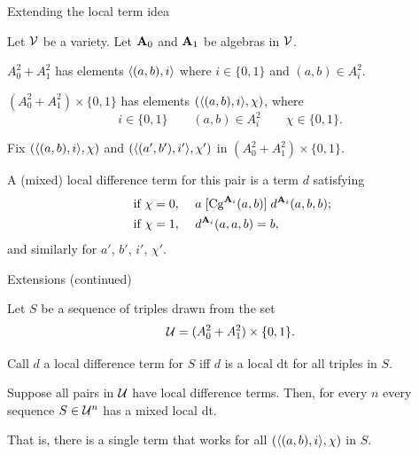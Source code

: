 \documentclass[notes=hide,12pt,xcolor=dvipsnames%
   ]{beamer}
\renewcommand{\defn}[1]{\alert{#1}}
\newcommand{\defin}[1]{\alert{#1}}
\theoremstyle{definition}
\begin{document}
\begin{frame}[label=extensions]{Extending the local term idea}

Let $\mathcal{V}$ be a variety.
Let $\mathbf{A}_0$ and  $\mathbf{A}_1$ be algebras in $\mathcal{V}$.


$A_0^2 + A_1^2$ has elements
$\langle(a,b), i\rangle$ where $i\in \{0,1\}$ and $(a,b) \in A_i^2$.

$(A_0^2 + A_1^2) \times \{0,1\}$
has elements $(\langle(a,b), i\rangle, \chi)$, where
\[
i\in \{0,1\} \qquad  (a,b) \in A_i^2 \qquad \chi\in \{0,1\}.
\]

Fix $(\langle(a, b),i\rangle, \chi)$ and $(\langle(a', b'),i'\rangle, \chi')$ in
$(A_0^2 + A_1^2) \times \{0,1\}$.

A (mixed) \defn{local difference term} for this pair is a term $d$ satisfying
\begin{align*}
  \text{ if $\chi=0$,  }\quad & a \mathrel{[\operatorname{Cg}^{\mathbf{A}_i}(a,b)]} d^{\mathbf{A}_i}(a,b,b);\\
  \text{ if $\chi=1$,  }\quad &d^{\mathbf{A}_i}(a,a,b) = b,
\end{align*}
and similarly for $a'$, $b'$, $i'$, $\chi'$.
\end{frame}


\begin{frame}[label=extensions]{Extensions (continued)}

  Let $S$ be a sequence of triples drawn from the set
  \[
  \mathcal{U} = (A_0^2 + A_1^2) \times \{0,1\}.
  \]

  Call $d$ a \defin{local difference term for $S$} iff $d$ is a local dt for all triples in $S$.


  Suppose all pairs in $\mathcal{U}$ have local difference terms.
  Then, for every $n$
  every sequence $S\in \mathcal{U}^n$ has a mixed local dt.

  That is, there is a single term that works
  for all $(\langle(a, b), i\rangle,\chi)$ in $S$.
\end{frame}
\end{document}
